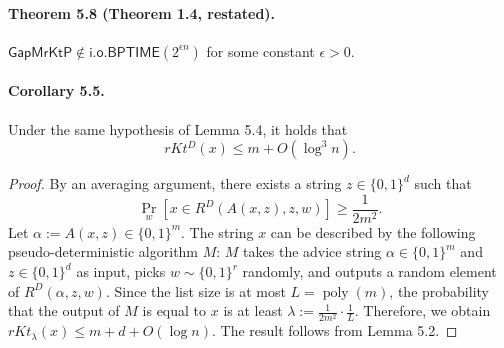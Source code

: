 \documentclass[10pt,a4paper]{article}
\begin{document}
\paragraph{Theorem 5.8 (Theorem 1.4, restated).}
$\mathsf{GapMrKtP}\notin\mathsf{i.o.BPTIME}(2^{\epsilon n})$ for some constant $\epsilon>0$.

\paragraph{Corollary 5.5.}
Under the same hypothesis of Lemma 5.4, it holds that
\[rKt^D(x)\leq m+O(\log^3 n).\]
\begin{proof}
By an averaging argument, there exists a string $z\in\{0,1\}^d$ such that
\[\Pr_w[x\in R^D(A(x,z),z,w)]\geq\frac1{2m^2}.\]
Let $\alpha:=A(x,z)\in\{0,1\}^m$. The string $x$ can be described by the following pseudo-deterministic algorithm $M$: $M$ takes the advice string $\alpha\in\{0,1\}^m$ and $z\in\{0,1\}^d$ as input, picks $w\sim\{0,1\}^r$ randomly, and outputs a random element of $R^D(\alpha,z,w)$. Since the list size is at most $L=\operatorname{poly}(m)$, the probability that the output of $M$ is equal to $x$ is at least $\lambda:=\frac1{2m^2}\cdot\frac1L$. Therefore, we obtain $rKt_\lambda(x)\leq m+d+O(\log n)$. The result follows from Lemma 5.2.
\end{proof}
\end{document}

